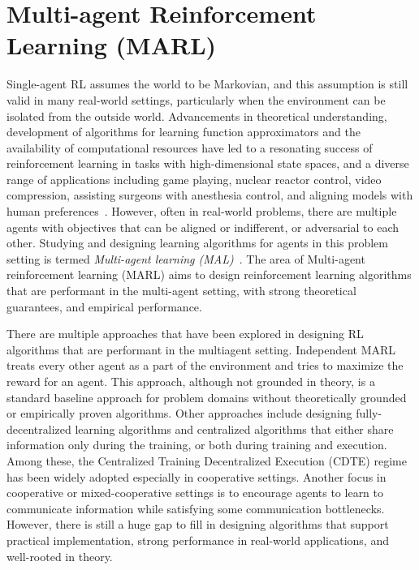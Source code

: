 \section{Multi-agent Reinforcement Learning (MARL)}\label{sec:marl}
Single-agent RL assumes the world to be Markovian, and this assumption is still valid in many
real-world settings, particularly when the environment can be isolated from the outside world.
Advancements in theoretical understanding, development of algorithms for learning function
approximators and the availability of computational resources have led to a resonating success of
reinforcement learning in tasks with high-dimensional state spaces, and a diverse range of
applications including game playing, nuclear reactor control, video compression, assisting surgeons
with anesthesia control, and aligning models with human
preferences~\cite{schambergContinuous2022,perolatMastering2022,ouyangTraining2022a,mandhaneMuZero2022}.
However, often in real-world problems, there are multiple agents with objectives that can be
aligned or indifferent, or adversarial to each other.
Studying and designing learning algorithms for agents in this problem setting is termed
\textit{Multi-agent learning (MAL)}~\cite{tuylsMultiagent2012}.
The area of Multi-agent reinforcement learning (MARL) aims to design reinforcement learning
algorithms that are performant in the multi-agent setting, with strong theoretical guarantees, and
empirical performance.

There are multiple approaches that have been explored in designing RL algorithms that are
performant in the multiagent setting.
Independent MARL treats every other agent as a part of the environment and tries to maximize the
reward for an agent.
This approach, although not grounded in theory, is a standard baseline approach for problem domains
without theoretically grounded or empirically proven algorithms.
Other approaches include designing fully-decentralized learning algorithms and centralized
algorithms that either share information only during the training, or both during training and
execution.
Among these, the Centralized Training Decentralized Execution (CDTE) regime has been widely adopted
especially in cooperative settings.
Another focus in cooperative or mixed-cooperative settings is to encourage agents to learn to
communicate information while satisfying some communication bottlenecks.
However, there is still a huge gap to fill in designing algorithms that support practical
implementation, strong performance in real-world applications, and well-rooted in theory.


